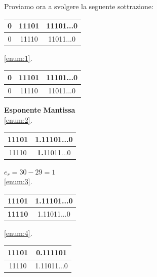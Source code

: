 \begin{example}[Sottrazione]
    Proviamo ora a svolgere la seguente sottrazione:
    \begin{center}
    \begin{tabular}{|c|c|c|}
        \hline0 & 11101 & 11101...0\\\hline
        \hline0 & 11110 & 11011...0\\\hline
    \end{tabular}
    \end{center}
    \begin{center}
    \ref{enum:1}.\hspace{1cm}
    \begin{tabular}{|c|c|c|}
        \hline0 & 11101 & 11101...0\\\hline
        \hline0 & 11110 & 11011...0\\\hline
    \end{tabular}
    \end{center}
    \begin{center}
    \textbf{Esponente} \hspace{0.5cm} \textbf{Mantissa}\\
    \ref{enum:2}.\hspace{1cm}
    \begin{tabular}{|c|c|}
        \hline 11101 & \textbf{1.}11101...0\\\hline
        \hline 11110 & \textbf{1.}11011...0\\\hline
    \end{tabular}
    \end{center}
    \begin{center}
    $e_r=30-29=1$\\
    \ref{enum:3}.\hspace{1cm}
    \begin{tabular}{|c|c|}
        \hline 11101 & 1.11101...0\\\hline
        \hline \textbf{11110} & 1.11011...0\\\hline
    \end{tabular}
    \end{center}
    \begin{center}
    \ref{enum:4}.\hspace{1cm}
    \begin{tabular}{|c|c|}
        \hline 11101 & \textbf{0.1}11101\\\hline
        \hline 11110 & 1.11011...0\\\hline

\end{tabular}
\end{center}
\end{example}
